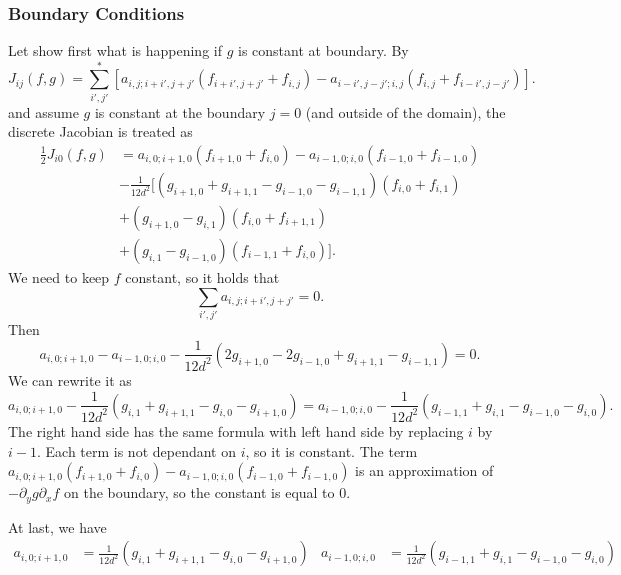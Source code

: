 \subsubsection{Boundary Conditions}

Let show first what is happening if $g$ is constant at boundary. By
\begin{equation}
    J_{ij}(f,g)=\sum^*_{i',j'}[a_{i,j;i+i',j+j'}(f_{i+i',j+j'}+f_{i,j})-a_{i-i',j-j';i,j}(f_{i,j}+f_{i-i',j-j'})].
\end{equation}
and assume $g$ is constant at the boundary $j=0$ (and outside of the domain), the discrete Jacobian is treated as
\begin{equation}
\begin{aligned}
\frac{1}{2}J_{i0} (f,g) &= a_{i,0;i+1,0}(f_{i+1,0}+f_{i,0})-a_{i-1,0;i,0}(f_{i-1,0}+f_{i-1,0})\\
&-\frac{1}{12d^2}[(g_{i+1,0}+g_{i+1,1}-g_{i-1,0}-g_{i-1,1})(f_{i,0}+f_{i,1})\\
&+(g_{i+1,0}-g_{i,1})(f_{i,0}+f_{i+1,1})\\
&+(g_{i,1}-g_{i-1,0})(f_{i-1,1}+f_{i,0})].
\end{aligned}
\end{equation}
We need to keep $f$ constant, so it holds that $$\sum_{i',j'} a_{i,j;i+i',j+j'}=0.$$ 
Then 
$$a_{i,0;i+1,0}-a_{i-1,0;i,0}-\frac{1}{12d^2}(2g_{i+1,0}-2g_{i-1,0}+g_{i+1,1}-g_{i-1,1})=0.$$
We can rewrite it as 
$$a_{i,0;i+1,0}-\frac{1}{12d^2}(g_{i,1}+g_{i+1,1}-g_{i,0}-g_{i+1,0})=a_{i-1,0;i,0}-\frac{1}{12d^2}(g_{i-1,1}+g_{i,1}-g_{i-1,0}-g_{i,0}).$$
The right hand side has the same formula with left hand side by replacing $i$ by $i-1$. Each term is not dependant on $i$, so it is constant. The term $a_{i,0;i+1,0}(f_{i+1,0}+f_{i,0})-a_{i-1,0;i,0}(f_{i-1,0}+f_{i-1,0})$ is an approximation of $-\partial_y g \partial_x f$ on the boundary, so the constant is equal to $0$.

At last, we have
\begin{align}
	a_{i,0;i+1,0} & = \frac{1}{12d^2}(g_{i,1}+g_{i+1,1}-g_{i,0}-g_{i+1,0}) &
	a_{i-1,0;i,0} & = \frac{1}{12d^2}(g_{i-1,1}+g_{i,1}-g_{i-1,0}-g_{i,0})
\end{align}

